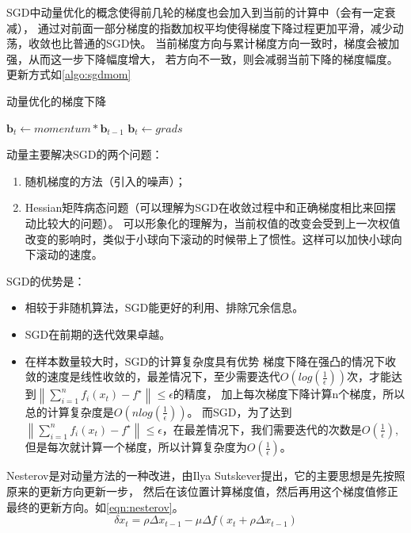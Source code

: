 \documentclass[a4paper,twoside,twocolumn]{article}
\begin{document}
\begin{spacing}{1.2}
SGD中动量优化的概念使得前几轮的梯度也会加入到当前的计算中（会有一定衰减），
通过对前面一部分梯度的指数加权平均使得梯度下降过程更加平滑，减少动荡，收敛也比普通的SGD快。
当前梯度方向与累计梯度方向一致时，梯度会被加强，从而这一步下降幅度增大，
若方向不一致，则会减弱当前下降的梯度幅度。更新方式如\eqref{algo:sgdmom}

\begin{algorithm}[htbp]
	\caption{动量优化的梯度下降}
	\label{algo:sgdmom}
	\begin{algorithmic}[1]
		\State $\mathbf{b}_{t} \gets momentum*\mathbf{b}_{t-1}$
		\Else
		\State $\mathbf{b}_{t} \gets grads$
		\EndIf
	\end{algorithmic}
\end{algorithm}	

动量主要解决SGD的两个问题：
\begin{enumerate}
	\item 随机梯度的方法（引入的噪声）；
	\item Hessian矩阵病态问题（可以理解为SGD在收敛过程中和正确梯度相比来回摆动比较大的问题）。  可以形象化的理解为，当前权值的改变会受到上一次权值改变的影响时，类似于小球向下滚动的时候带上了惯性。这样可以加快小球向下滚动的速度。
\end{enumerate}
SGD的优势是：
\begin{itemize}
	\item 相较于非随机算法，SGD能更好的利用、排除冗余信息。
	\item SGD在前期的迭代效果卓越。
	\item 在样本数量较大时，SGD的计算复杂度具有优势
	梯度下降在强凸的情况下收敛的速度是线性收敛的，最差情况下，至少需要迭代$O(log(\frac{1}{\epsilon}))$次，才能达到$\left\|\sum_{i=1}^{n} f_{i}\left(x_{t}\right)-f^{\star}\right\| \leqslant \epsilon$的精度，
	加上每次梯度下降计算n个梯度，所以总的计算复杂度是$O(nlog(\frac{1}{\epsilon}))$。
	而SGD，为了达到$\left\|\sum_{i=1}^{n} f_{i}\left(x_{t}\right)-f^{\star}\right\| \leqslant \epsilon$，在最差情况下，我们需要迭代的次数是$O(\frac{1}{\epsilon})$,但是每次就计算一个梯度，所以计算复杂度为$O(\frac{1}{\epsilon})$。
\end{itemize}

Nesterov是对动量方法的一种改进，由Ilya Sutskever提出，它的主要思想是先按照原来的更新方向更新一步，
然后在该位置计算梯度值，然后再用这个梯度值修正最终的更新方向。如\eqref{eqn:nesterov}。
\begin{equation}
	\label{eqn:nesterov}
	\delta x_t=\rho \Delta x_{t-1}-\mu \Delta f(x_t+\rho \Delta x_{t-1})
\end{equation}


\end{spacing}
\end{document}
